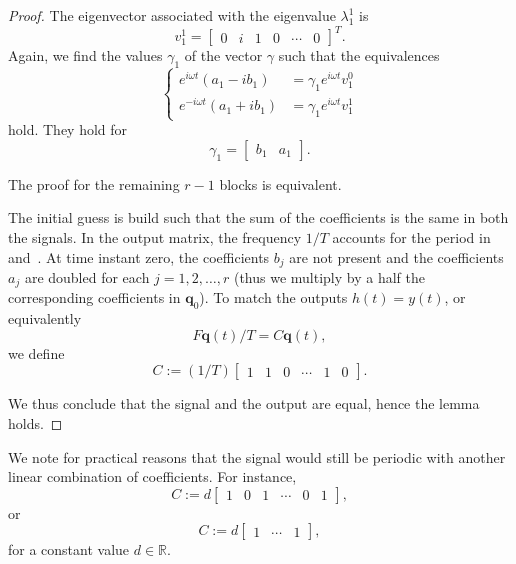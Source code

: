 \begin{proof}
The eigenvector associated with the eigenvalue $\lambda_1^1$ is 
\begin{equation}
  v_1^1=\begin{bmatrix}0&i&1&0&\cdots&0\end{bmatrix}^T. 
\end{equation}
Again, we find the values $\gamma_1$ of the vector $\gamma$ such that the equivalences 
\begin{equation}\begin{cases}    
  e^{i\omega t}(a_1-ib_1)&=\gamma_1 e^{i\omega t}v_1^0\\
  e^{-i\omega t}(a_1+ib_1)&=\gamma_1 e^{i\omega t}v_1^1
\end{cases}\end{equation}
hold. They hold for 
\begin{equation}
  \gamma_1=\begin{bmatrix}b_1&a_1\end{bmatrix}.
\end{equation} 

The proof for the remaining $r-1$ blocks is equivalent.

The initial guess is build such that the sum of the coefficients is the same in both the signals. In the output matrix, the frequency $1/T$ accounts for the period in  and~. At time instant zero, the coefficients $b_j$ are not present and the coefficients $a_j$ are doubled for each $j=1,2,\dots,r$ (thus we multiply by a half the corresponding coefficients in $\mathbf{q}_0$). To match the outputs $h(t)=y(t)$, or equivalently 
\begin{equation}
  F\mathbf{q}(t)/T=C\mathbf{q}(t), 
\end{equation}
we define 
\begin{equation}
  C:=(1/T)\begin{bmatrix}1 & 1 & 0 & \cdots & 1 & 0\end{bmatrix}.
\end{equation}

We thus conclude that the signal and the output are equal, hence the lemma holds.

\end{proof}

We note for practical reasons that the signal would still be periodic with another linear combination of coefficients. For instance, 
\begin{equation}
  C:=d\begin{bmatrix}1 & 0 & 1 & \cdots & 0 & 1\end{bmatrix},
\end{equation} 
or 
\begin{equation}
  C:=d\begin{bmatrix}1 & \cdots & 1\end{bmatrix},
\end{equation} 
for a constant value $d\in\mathbb{R}$.

